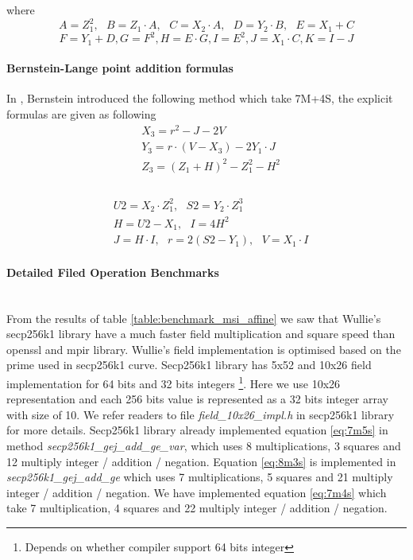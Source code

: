where
$$ A = Z_1^2, \text{ } B = Z_1 \cdot A, \text{ } C = X_2 \cdot A, \text{ } D = Y_2 \cdot B, \text{ } E = X_1 + C $$
$$ F = Y_1 + D, G = F^2, H = E  \cdot G, I = E^2, J = X_1 \cdot C, K = I - J $$

\paragraph{Bernstein-Lange point addition formulas}
In \cite{bernstein2007faster}, Bernstein introduced the following method which take 7M+4S, the explicit formulas are given as following \cite{bernstein2007explicit}
\begin{equation} \label{eq:7m4s}
\begin{split}
& X_3 = r^2 - J - 2 V \\
& Y_3 = r \cdot (V-X_3)-2Y_1 \cdot J \\
& Z_3 = (Z_1+H)^2 - Z_1^2 - H^2 \\
\end{split}
\end{equation}
\\
\begin{equation*}
\begin{split}
& U2 = X_2 \cdot Z_1^2,\text{ } S2 = Y_2 \cdot Z_1^3 \\
& H = U2 - X_1 , \text{ } I = 4 H^2 \\
& J = H \cdot I , \text{ } r = 2  (S2-Y_1) , \text{ } V = X_1 \cdot I 
\end{split}
\end{equation*}



\paragraph{Detailed Filed Operation Benchmarks} \mbox{} \\
From the results of table \ref {table:benchmark_msi_affine} we saw that Wullie's secp256k1 library \cite{Wulliesecp256k1} have a much faster field multiplication and square speed than openssl and mpir library.
Wullie's field implementation is optimised based on the prime used in secp256k1 curve. Secp256k1 library has 5x52 and 10x26 field implementation for 64 bits and 32 bits integers \footnote {Depends on whether compiler support 64 bits integer}. Here we use 10x26 representation and each 256 bits value is represented as a 32 bits integer array with size of 10. We refer readers to file \textit{field\_10x26\_impl.h} in secp256k1 library for more details. Secp256k1 library already implemented equation \ref{eq:7m5s} in method \textit{secp256k1\_gej\_add\_ge\_var}, which uses 8 multiplications, 3 squares and 12 multiply integer / addition / negation. Equation \ref{eq:8m3s} is implemented in \textit{secp256k1\_gej\_add\_ge} which uses 7 multiplications, 5 squares and 21 multiply integer / addition / negation. We have implemented equation \ref{eq:7m4s} which take 7 multiplication, 4 squares and 22 multiply integer / addition / negation.

